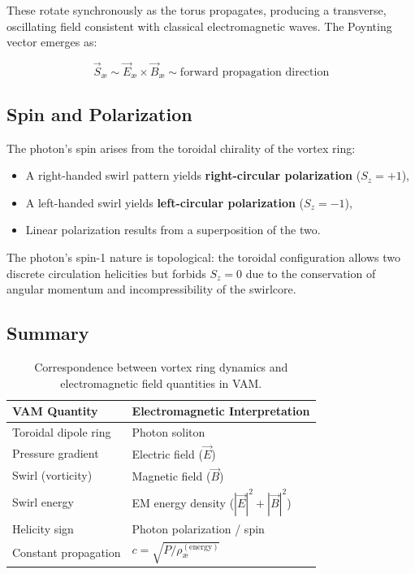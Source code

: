 \documentclass[preprint]{revtex4-2}
\begin{document}
\noindent
These rotate synchronously as the torus propagates, producing a transverse, oscillating field consistent with classical electromagnetic waves. The Poynting vector emerges as:

\begin{equation}
    \vec{S}_\text{æ} \sim \vec{E}_\text{æ} \times \vec{B}_\text{æ} \sim \text{forward propagation direction}
\end{equation}

\subsection{Spin and Polarization}

The photon’s spin arises from the toroidal chirality of the vortex ring:

\begin{itemize}
    \item A right-handed swirl pattern yields \textbf{right-circular polarization} ($S_z = +1$),
    \item A left-handed swirl yields \textbf{left-circular polarization} ($S_z = -1$),
    \item Linear polarization results from a superposition of the two.
\end{itemize}

The photon's spin-1 nature is topological: the toroidal configuration allows two discrete circulation helicities but forbids $S_z = 0$ due to the conservation of angular momentum and incompressibility of the swirlcore.

\subsection{Summary}

\begin{table}[H]
\centering
\renewcommand{\arraystretch}{1.3}
\begin{tabular}{ll}
\toprule
\textbf{VAM Quantity} & \textbf{Electromagnetic Interpretation} \\
\midrule
Toroidal dipole ring     & Photon soliton \\
Pressure gradient        & Electric field ($\vec{E}$) \\
Swirl (vorticity)        & Magnetic field ($\vec{B}$) \\
Swirl energy             & EM energy density ($|\vec{E}|^2 + |\vec{B}|^2$) \\
Helicity sign            & Photon polarization / spin \\
Constant propagation     & $c = \sqrt{P/\rho_\text{\ae}^{(\text{energy})}}$ \\
\bottomrule
\end{tabular}
\caption{Correspondence between vortex ring dynamics and electromagnetic field quantities in VAM.}
\end{table}
\end{document}
